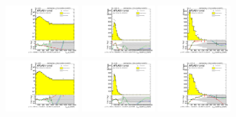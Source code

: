 \begin{figure}[htbp!]
\begin{center}
\includegraphics[width=0.25\textwidth,angle=-90]{figures/boosted/Reweight/Fits/Moriond_NoTag_4Trk_lead_Incl_sublHCand_Pt_m_1.pdf}
\includegraphics[width=0.25\textwidth,angle=-90]{figures/boosted/Reweight/Fits/Moriond_NoTag_4Trk_lead_Incl_sublHCand_trk0_Pt.pdf}
\includegraphics[width=0.25\textwidth,angle=-90]{figures/boosted/Reweight/Fits/Moriond_NoTag_4Trk_lead_Incl_sublHCand_trk1_Pt.pdf} \\
\includegraphics[width=0.25\textwidth,angle=-90]{figures/boosted/Reweight/Fits/Moriond_bkg_0_NoTag_4Trk_lead_Incl_sublHCand_Pt_m_1.pdf}
\includegraphics[width=0.25\textwidth,angle=-90]{figures/boosted/Reweight/Fits/Moriond_bkg_0_NoTag_4Trk_lead_Incl_sublHCand_trk0_Pt.pdf}
\includegraphics[width=0.25\textwidth,angle=-90]{figures/boosted/Reweight/Fits/Moriond_bkg_0_NoTag_4Trk_lead_Incl_sublHCand_trk1_Pt.pdf} \\

\end{center}
\end{figure}
